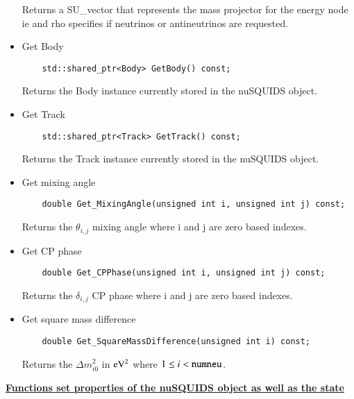 \begin{itemize}
\begin{lstlisting}
  \end{lstlisting}
  Returns a {\ttf SU\_vector} that represents the mass projector for the energy node {\ttf ie} and 
  {\ttf rho} specifies if neutrinos or antineutrinos are requested.
  \item Get {\ttfamily Body}
  \begin{lstlisting}
    std::shared_ptr<Body> GetBody() const;
  \end{lstlisting}
  Returns the {\ttf Body} instance currently stored in the {\ttf nuSQUIDS} object.
  \item Get {\ttfamily Track}
  \begin{lstlisting}
    std::shared_ptr<Track> GetTrack() const;
  \end{lstlisting}
  Returns the {\ttf Track} instance currently stored in the {\ttf nuSQUIDS} object.
  \item Get mixing angle
  \begin{lstlisting}
    double Get_MixingAngle(unsigned int i, unsigned int j) const;
  \end{lstlisting}
  Returns the $\theta_{i,j}$ mixing angle where {\ttf i} and {\ttf j} are zero based indexes.
  \item Get CP phase
  \begin{lstlisting}
    double Get_CPPhase(unsigned int i, unsigned int j) const;
  \end{lstlisting}
  Returns the $\delta_{i,j}$ CP phase where {\ttf i} and {\ttf j} are zero based indexes.
  \item Get square mass difference
  \begin{lstlisting}
    double Get_SquareMassDifference(unsigned int i) const;
  \end{lstlisting}
  Returns the $\Delta m^2_{i0}$ in ${\rm eV}^2$ where $1\le i < {\rm \tt numneu}$.
  \end{itemize}
  
\underline{\textbf{Functions set properties of the nuSQUIDS object as well as the state}}

